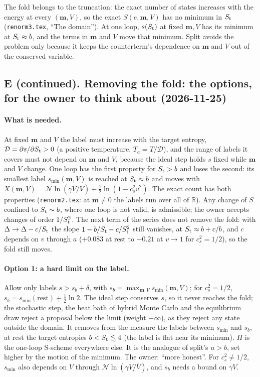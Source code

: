 \documentclass[11pt,aps,preprint,nofootinbib,superscriptaddress,tightenlines]{revtex4-2}
\let\oldparagraph\paragraph
\renewcommand{\paragraph}{\par\bigskip\oldparagraph}
\begin{document}
The fold belongs to the truncation: the exact number of states increases with the energy at every $(\bm m,V)$, so the exact $S(e,\bm m,V)$ has no
minimum in $S_{\rm t}$ (\nolinkurl{renorm3.tex}, ``The domain'').  At one loop, $s(S_{\rm t})$ at fixed $\bm m,V$ has its minimum at
$S_{\rm t}\approx b$, and the terms in $\bm m$ and $V$ move that minimum.  Split avoids the problem only because it keeps the counterterm's dependence
on $\bm m$ and $V$ out of the conserved variable.

\subsection*{E (continued). Removing the fold: the options, for the owner to think about (2026-11-25)}

\paragraph{What is needed.}  At fixed $\bm m$ and $V$ the label must increase with the target entropy, $\mathcal D=\partial s/\partial S_{\rm t}>0$ (a positive
temperature, $T_a=T/\mathcal D$), and the range of labels it covers must not depend on $\bm m$ and $V$, because the ideal step holds $s$ fixed while
$\bm m$ and $V$ change.  One loop has the first property for $S_{\rm t}>b$ and loses the second: its smallest label $s_{\min}(\bm m,V)$ is reached at
$S_{\rm t}\approx b$ and moves with $X(\bm m,V)=\mathcal N\ln(\gamma V/\bar V)+\tfrac12\ln(1-c_s^2v^2)$.  The exact count has both properties
(\nolinkurl{renorm2.tex}: at $\bm m\ne0$ the labels run over all of $\mathbb R$).  Any change of $S$ confined to $S_{\rm t}\sim b$, where one loop is not
valid, is admissible; the owner accepts changes of order $1/S_{\rm t}^2$.  The next term of the series does not remove the fold: with
$\Delta\to\Delta-c/S_{\rm t}$ the slope $1-b/S_{\rm t}-c/S_{\rm t}^2$ still vanishes, at $S_{\rm t}\approx b+c/b$, and $c$ depends on $v$ through $a$
($+0.083$ at rest to $-0.21$ at $v\to1$ for $c_s^2=1/2$), so the fold still moves.

\paragraph{Option 1: a hard limit on the label.}  Allow only labels $s>s_b+\delta$, with $s_b=\max_{\bm m,V}s_{\min}(\bm m,V)$; for $c_s^2=1/2$,
$s_b=s_{\min}(\text{rest})+\tfrac12\ln2$.  The ideal step conserves $s$, so it never reaches the fold; the stochastic step, the heat bath of hybrid
Monte Carlo and the equilibrium draw reject a proposal below the limit (weight $-\infty$), as they reject any state outside the domain.  It removes
from the measure the labels between $s_{\min}$ and $s_b$, at rest the target entropies $b<S_{\rm t}\lesssim4$ (the label is flat near its minimum).
$H$ is the one-loop S-scheme everywhere else.  It is the analogue of split's $u>b$, set higher by the motion of the minimum.  The owner: ``more
honest''.  For $c_s^2\ne1/2$, $s_{\min}$ also depends on $V$ through $\mathcal N\ln(\gamma V/\bar V)$, and $s_b$ needs a bound on $\gamma V$.
\end{document}

